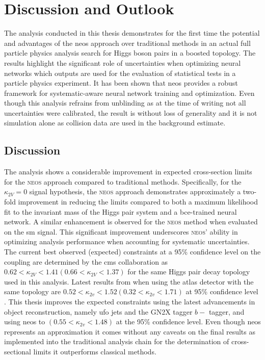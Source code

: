 
\chapter{Discussion and Outlook}
The analysis conducted in this thesis demonstrates for the first time the potential and advantages of the \ac{neos} approach over traditional methods in an actual full particle physics analysis search for Higgs boson pairs in a boosted topology. The results highlight the significant role of uncertainties when optimizing neural networks which outputs are used for the evaluation of statistical tests in a particle physics experiment. It has been shown that \ac{neos} provides a robust framework for systematic-aware neural network training and optimization. Even though this analysis refrains from unblinding as at the time of writing not all uncertainties were calibrated, the result is without loss of generality and it is not simulation alone as collision data are used in the background estimate.

\section{Discussion}
The analysis shows a considerable improvement in expected cross-section limits for the \textsc{neos} approach compared to traditional methods. Specifically, for the $\kappa_{2V} = 0$ signal hypothesis, the \textsc{neos} approach demonstrates approximately a two-fold improvement in reducing the limits compared to both a maximum likelihood fit to the invariant mass of the Higgs pair system \mhh and a \ac{bce}-trained neural network. A similar enhancement is observed for the \textsc{neos} method when evaluated on the \ac{sm} signal. This significant improvement underscores \textsc{neos}' ability in optimizing analysis performance when accounting for systematic uncertainties. The current best observed (expected) constraints at a 95\% confidence level on the \ktwov coupling are determined by the \ac{cms} collaboration \citep{PhysRevLett.131.041803} as $ 0.62 < \kappa_{2V} < 1.41 (0.66 < \kappa_{2V}< 1.37)$ for the same Higgs pair decay topology used in this analysis. Latest results from when using the \ac{atlas} detector with the same topology are  $0.52 < \kappa_{2v}< 1.52 (0.32 < \kappa_{2v}< 1.71)$ at 95\% confidence level \citep{atlascollaboration2024searchpairproductionboosted}. This thesis improves the expected constraints using the latest advancements in object reconstruction, namely \ac{ufo} jets and the GN2X tagger $b-$ tagger, and using \ac{neos} to $(0.55 < \kappa_{2v}< 1.48)$ at the 95\% confidence level.  Even though \ac{neos} represents an approximation it comes without any caveats on the final results as implemented into the traditional analysis chain for the determination of cross-sectional limits it outperforms classical methods.

